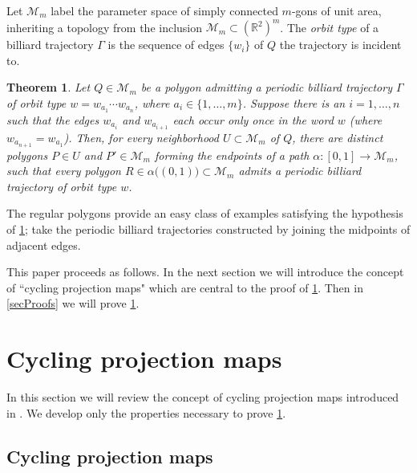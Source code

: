 \documentclass[12pt]{amsart}
\theoremstyle{theorem}
\newtheorem{theorem}{Theorem}
\theoremstyle{remark}
\numberwithin{equation}{section}
\newcommand{\RR}{\mathbb{R}}
\newcommand{\cM}{\mathcal{M}}
\begin{document}
Let $\cM_m$ label the parameter space of simply connected $m$-gons of unit area, inheriting a topology from the inclusion $\cM_m\subset (\RR^2)^m$. The \emph{orbit type} of a billiard trajectory $\Gamma$ is the sequence of edges $\{w_i\}$ of $Q$ the trajectory is incident to.

\begin{theorem}\label{thm:main}
Let $Q \in \cM_m$ be a polygon admitting a periodic billiard trajectory $\Gamma$ of orbit type $w = w_{a_1}\cdots w_{a_n}$, where $a_i \in \{1,\dots,m\}$.
Suppose there is an $i=1,\dots, n$ such that the edges $w_{a_i}$ and $w_{a_{i+1}}$ each occur only once in the word $w$ (where $w_{a_{n+1}} = w_{a_1}$).
Then, for every neighborhood $U \subset \cM_m$ of $Q$, there are distinct polygons $P \in U$ and $P' \in \cM_m$ forming the endpoints of a path $\alpha:[0,1]\rightarrow \cM_m$, such that every polygon $R \in \alpha\bigl((0,1)\bigr)\subset \cM_m$ admits a periodic billiard trajectory of orbit type $w$.
\end{theorem}

The regular polygons provide an easy class of examples satisfying the hypothesis of \cref{thm:main}; take the periodic billiard trajectories constructed by joining the midpoints of adjacent edges.

This paper proceeds as follows. In the next section we will introduce the concept of ``cycling projection maps" which are central to the proof of \cref{thm:main}.
Then in \cref{secProofs} we will prove \cref{thm:main}.


\section{Cycling projection maps}\label{secPrelim}

In this section we will review the concept of cycling projection maps introduced in \cite{everett2025geometric}. We develop only the properties necessary to prove \cref{thm:main}.


\subsection{Cycling projection maps}
\end{document}
